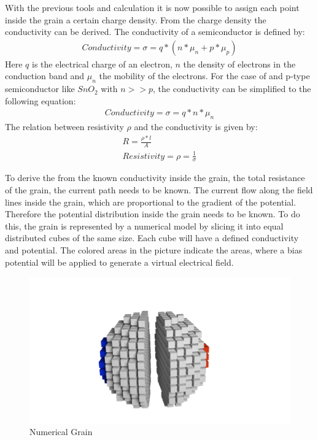\documentclass[11pt]{article}
\begin{document}
    With the previous tools and calculation it is now possible to assign
each point inside the grain a certain charge density. From the charge
density the conductivity can be derived. The conductivity of a
semiconductor is defined by: \begin{align}
 Conductivity  = \sigma = q*\left(n*\mu_n +p*\mu_p\right)
\end{align} Here \(q\) is the electrical charge of an electron, \(n\)
the density of electrons in the conduction band and \(\mu_n\) the
mobility of the electrons. For the case of and p-type semiconductor like
\(SnO_2\) with \(n>>p\), the conductivity can be simplified to the
following equation: \begin{align}
Conductivity  = \sigma = q*n*\mu_n 
\end{align} The relation between resistivity \(\rho\) and the
conductivity is given by: \begin{align}
R = \frac{{\rho}*l}{A}\\
Resistivity  = \rho = \frac{1}{\sigma}
\end{align}

To derive the from the known conductivity inside the grain, the total
resistance of the grain, the current path needs to be known. The current
flow along the field lines inside the grain, which are proportional to
the gradient of the potential. Therefore the potential distribution
inside the grain needs to be known. To do this, the grain is represented
by a numerical model by slicing it into equal distributed cubes of the
same size. Each cube will have a defined conductivity and potential. The
colored areas in the picture indicate the areas, where a bias potential
will be applied to generate a virtual electrical field.

\begin{figure}
\centering
\includegraphics{media/pics/sliced_cube.png}
\caption{Numerical Grain}
\end{figure}
\end{document}
